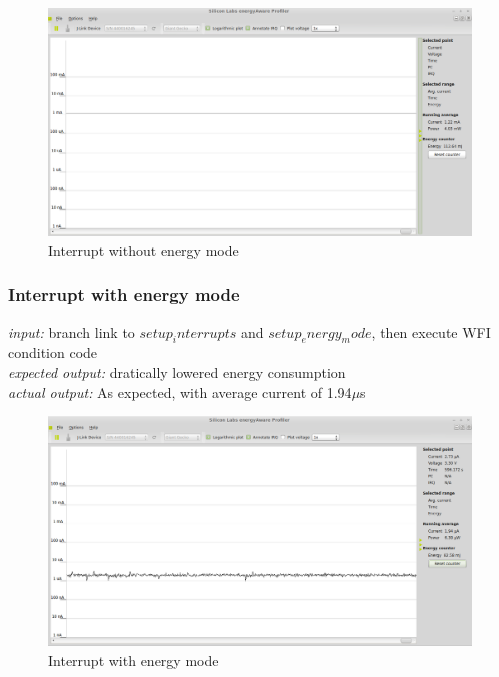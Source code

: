 	\begin{center}
		\begin{figure}[H]
		
			\includegraphics[width=\textwidth]{fig/InterruptOnly.png}
			\caption{Interrupt without energy mode}
		\end{figure}
	\end{center}

		
	\subsubsection{Interrupt with energy mode}
	\emph{input: }	branch link to $setup_interrupts$ and $setup_energy_mode$, then execute WFI condition code \\
	\emph{expected output: } dratically lowered energy consumption \\
	\emph{actual output: } As expected, with average current of 1.94$\mu$s \\
	
	\begin{center}
		\begin{figure}[H]
			\includegraphics[width=\textwidth]{fig/interruptsAndEnergy.png}	
			\caption{Interrupt with energy mode}
		\end{figure}
	\end{center}
	
